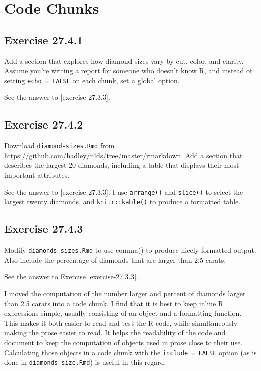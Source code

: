\documentclass[]{book}
\theoremstyle{plain}
\theoremstyle{remark}
\theoremstyle{definition}
\theoremstyle{definition}
\theoremstyle{definition}
\theoremstyle{remark}
\begin{document}
\hypertarget{code-chunks}{%
\section{Code Chunks}\label{code-chunks}}

\hypertarget{exercise-27.4.1}{%
\subsection*{\texorpdfstring{Exercise
{27.4.1}}{Exercise 27.4.1}}\label{exercise-27.4.1}}

Add a section that explores how diamond sizes vary by cut, color, and
clarity. Assume you're writing a report for someone who doesn't know R,
and instead of setting \texttt{echo\ =\ FALSE} on each chunk, set a
global option.

See the answer to {[}exercise-27.3.3{]}.

\hypertarget{exercise-27.4.2}{%
\subsection*{\texorpdfstring{Exercise
{27.4.2}}{Exercise 27.4.2}}\label{exercise-27.4.2}}

Download \texttt{diamond-sizes.Rmd} from
\url{https://github.com/hadley/r4ds/tree/master/rmarkdown}. Add a
section that describes the largest 20 diamonds, including a table that
displays their most important attributes.

See the answer to {[}exercise-27.3.3{]}. I use \texttt{arrange()} and
\texttt{slice()} to select the largest twenty diamonds, and
\texttt{knitr::kable()} to produce a formatted table.

\hypertarget{exercise-27.4.3}{%
\subsection*{\texorpdfstring{Exercise
{27.4.3}}{Exercise 27.4.3}}\label{exercise-27.4.3}}

Modify \texttt{diamonds-sizes.Rmd} to use comma() to produce nicely
formatted output. Also include the percentage of diamonds that are
larger than 2.5 carats.

See the answer to Exercise {[}exercise-27.3.3{]}.

I moved the computation of the number larger and percent of diamonds
larger than 2.5 carats into a code chunk. I find that it is best to keep
inline R expressions simple, usually consisting of an object and a
formatting function. This makes it both easier to read and test the R
code, while simultaneously making the prose easier to read. It helps the
readability of the code and document to keep the computation of objects
used in prose close to their use. Calculating those objects in a code
chunk with the \texttt{include\ =\ FALSE} option (as is done in
\texttt{diamonds-size.Rmd}) is useful in this regard.
\end{document}
